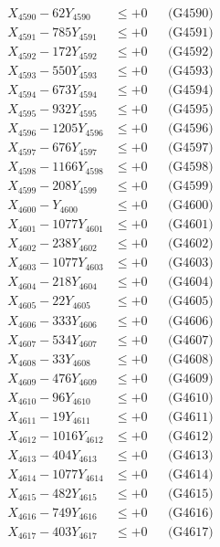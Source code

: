 \documentclass[a4paper,10pt]{article}
\begin{document}
{\begin{align}
X_{4590} - 62Y_{4590} &\leq +0 && \text{(G4590)} \\
\allowbreak
X_{4591} - 785Y_{4591} &\leq +0 && \text{(G4591)} \\
X_{4592} - 172Y_{4592} &\leq +0 && \text{(G4592)} \\
X_{4593} - 550Y_{4593} &\leq +0 && \text{(G4593)} \\
X_{4594} - 673Y_{4594} &\leq +0 && \text{(G4594)} \\
X_{4595} - 932Y_{4595} &\leq +0 && \text{(G4595)} \\
X_{4596} - 1205Y_{4596} &\leq +0 && \text{(G4596)} \\
X_{4597} - 676Y_{4597} &\leq +0 && \text{(G4597)} \\
X_{4598} - 1166Y_{4598} &\leq +0 && \text{(G4598)} \\
X_{4599} - 208Y_{4599} &\leq +0 && \text{(G4599)} \\
X_{4600} - Y_{4600} &\leq +0 && \text{(G4600)} \\
\allowbreak
X_{4601} - 1077Y_{4601} &\leq +0 && \text{(G4601)} \\
X_{4602} - 238Y_{4602} &\leq +0 && \text{(G4602)} \\
X_{4603} - 1077Y_{4603} &\leq +0 && \text{(G4603)} \\
X_{4604} - 218Y_{4604} &\leq +0 && \text{(G4604)} \\
X_{4605} - 22Y_{4605} &\leq +0 && \text{(G4605)} \\
X_{4606} - 333Y_{4606} &\leq +0 && \text{(G4606)} \\
X_{4607} - 534Y_{4607} &\leq +0 && \text{(G4607)} \\
X_{4608} - 33Y_{4608} &\leq +0 && \text{(G4608)} \\
X_{4609} - 476Y_{4609} &\leq +0 && \text{(G4609)} \\
X_{4610} - 96Y_{4610} &\leq +0 && \text{(G4610)} \\
\allowbreak
X_{4611} - 19Y_{4611} &\leq +0 && \text{(G4611)} \\
X_{4612} - 1016Y_{4612} &\leq +0 && \text{(G4612)} \\
X_{4613} - 404Y_{4613} &\leq +0 && \text{(G4613)} \\
X_{4614} - 1077Y_{4614} &\leq +0 && \text{(G4614)} \\
X_{4615} - 482Y_{4615} &\leq +0 && \text{(G4615)} \\
X_{4616} - 749Y_{4616} &\leq +0 && \text{(G4616)} \\
X_{4617} - 403Y_{4617} &\leq +0 && \text{(G4617)} \\

\end{align}}
\end{document}
